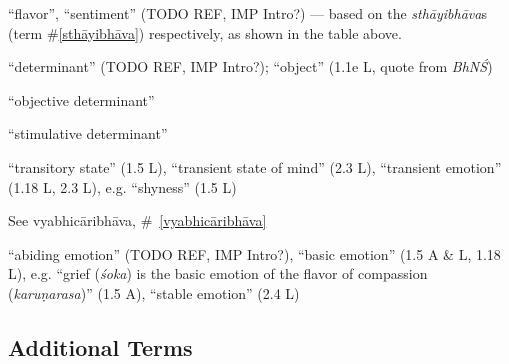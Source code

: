\documentclass[10pt]{article}
\begin{document}
\begin{multicols}{2}
\begin{enumerate}[
			leftmargin=0em,
			rightmargin=0em,
		]
		 ``flavor'', ``sentiment'' (TODO REF, IMP Intro?) --- based on the \textit{sthāyibhāva}s (term \#\ref{sthāyibhāva}) respectively, as shown in the table above.

		 ``determinant'' (TODO REF, IMP Intro?); ``object'' (1.1e L, quote from \textit{BhNŚ})
		\begin{enumerate}
			 ``objective determinant''

			 ``stimulative determinant''
		\end{enumerate}

		 ``transitory state'' (1.5 L), 
		``transient state of mind'' (2.3 L), %
		``transient emotion'' (1.18 L, 2.3 L),
		e.g. ``shyness'' (1.5 L)%

		 See vyabhicāribhāva, \#~\ref{vyabhicāribhāva}

		 ``abiding emotion''  (TODO REF, IMP Intro?),
		``basic emotion'' (1.5 A \& L, 1.18 L),
		e.g. ``grief (\textit{śoka}) is the basic emotion of the flavor of compassion (\textit{karuṇarasa})'' (1.5 A), %
		``stable emotion'' (2.4 L)

	\end{enumerate}

	\subsection{Additional Terms}

	\begin{enumerate}[
			leftmargin=0em,
			rightmargin=0em,
		]
		\setlength{\itemsep}{0.15em}
		\setcounter{enumi}{7}%


\end{enumerate}
\end{multicols}
\end{document}
